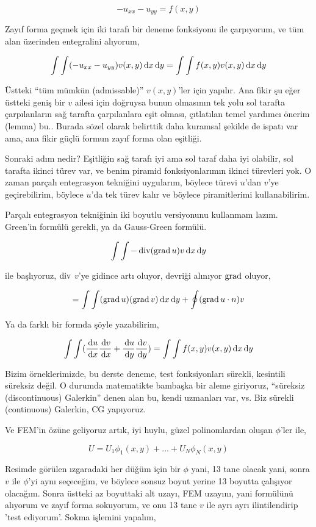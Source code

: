 \documentclass[12pt,fleqn]{article}\usepackage{../../common}
\begin{document}
$$
-u_{xx} - u_{yy} = f(x,y)
$$

Zayıf forma geçmek için iki tarafı bir deneme fonksiyonu ile çarpıyorum,
ve tüm alan üzerinden entegralini alıyorum,

$$
\int \int (-u_{xx} - u_{yy}) v(x,y) \,\mathrm{d} x \,\mathrm{d} y =
\int \int f(x,y) v(x,y)  \,\mathrm{d} x \,\mathrm{d} y
$$

Üstteki ``tüm mümkün (admissable)'' $v(x,y)$'ler için yapılır. Ana fikir şu eğer
üstteki geniş bir $v$ ailesi için doğruysa bunun olmasının tek yolu sol tarafta
çarpılanların sağ tarafta çarpılanlara eşit olması, çıtlatılan temel yardımcı
önerim (lemma) bu.. Burada sözel olarak belirttik daha kuramsal şekilde de
ispatı var ama, ana fikir güçlü formun zayıf forma olan eşitliği.

Sonraki adım nedir? Eşitliğin sağ tarafı iyi ama sol taraf daha iyi olabilir,
sol tarafta ikinci türev var, ve benim piramid fonksiyonlarımın ikinci türevleri
yok. O zaman parçalı entegrasyon tekniğini uygularım, böylece türevi $u$'dan
$v$'ye geçirebilirim, böylece $u$'da tek türev kalır ve böylece piramitlerimi
kullanabilirim. 

Parçalı entegrasyon tekniğinin iki boyutlu versiyonunu kullanmam lazım. Green'in
formülü gerekli, ya da Gauss-Green formülü. 

$$
\int \int -\operatorname{div} (\operatorname{grad} u) v \,\mathrm{d} x \,\mathrm{d} y
$$

ile başlıyoruz, $\operatorname{div}$ $v$'ye gidince artı oluyor, devriği alınıyor $\operatorname{grad}$
oluyor, 

$$
= \int \int
(\operatorname{grad} u) (\operatorname{grad} v) \,\mathrm{d} x \,\mathrm{d} y  +
\oint (\operatorname{grad} u \cdot n) v
$$

Ya da farklı bir formda şöyle yazabilirim, 

$$
\int \int
(
\frac{\,\mathrm{d} u}{\,\mathrm{d} x} \frac{\,\mathrm{d} v}{\,\mathrm{d} x} +
\frac{\,\mathrm{d} u}{\,\mathrm{d} y} \frac{\,\mathrm{d} v}{\,\mathrm{d} y} 
) =
\int \int f(x,y) v(x,y)  \,\mathrm{d} x \,\mathrm{d} y
$$

Bizim örneklerimizde, bu derste deneme, test fonksiyonları sürekli, kesintili
süreksiz değil. O durumda matematikte bambaşka bir aleme giriyoruz, ``süreksiz
(discontinuous) Galerkin'' denen alan bu, kendi uzmanları var, vs. Biz sürekli
(continuous) Galerkin, CG yapıyoruz.

Ve FEM'in özüne geliyoruz artık, iyi huylu, güzel polinomlardan oluşan
$\phi$'ler ile,

$$
U = U_1 \phi_1 (x,y) + ... + U_N \phi_N (x,y) 
$$

Resimde görülen ızgaradaki her düğüm için bir $\phi$ yani, 13 tane olacak yani,
sonra $v$ ile $\phi$'yi aynı seçeceğim, ve böylece sonsuz boyut yerine 13
boyutta çalışıyor olacağım. Sonra üstteki az boyuttaki alt uzayı, FEM uzayını,
yani formülünü alıyorum ve zayıf forma sokuyorum, ve onu 13 tane $v$ ile ayrı
ayrı ilintilendirip 'test ediyorum'. Sokma işlemini yapalım,
\end{document}
